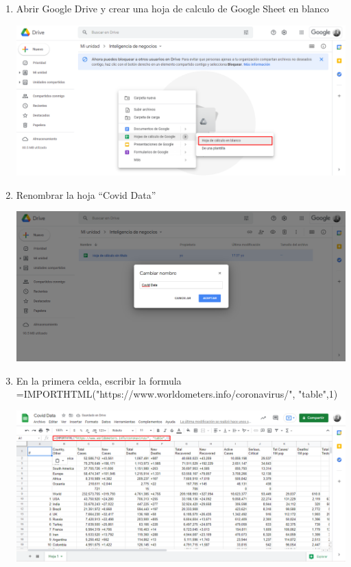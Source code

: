 \documentclass{article}
\begin{document}
\begin{enumerate}[\tab 1.]
            \item Abrir Google Drive y crear una hoja de calculo de Google Sheet en blanco
            \begin{center}
                \includegraphics[width=13cm]{./images/2.png}
            \end{center}
            \newpage
            \item Renombrar la hoja “Covid Data”
            \begin{center}
                \includegraphics[width=13cm]{./images/3.png}
            \end{center}
            \item  En la primera celda, escribir la formula
=IMPORTHTML("https://www.worldometers.info/coronavirus/", "table",1)
            \begin{center}
                \includegraphics[width=13cm]{./images/4.png}
            \end{center}
        \newpage
    \end{enumerate}
    
\end{document}
